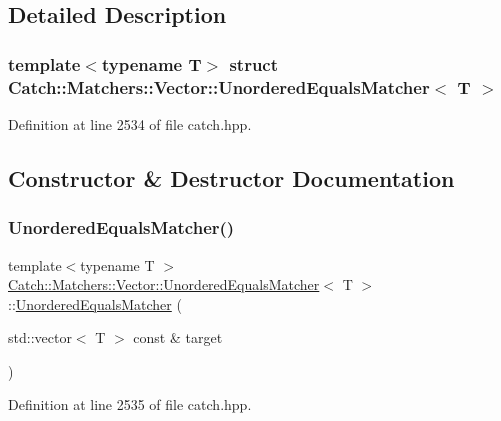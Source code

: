 \subsection{Detailed Description}
\subsubsection*{template$<$typename T$>$\newline
struct Catch\+::\+Matchers\+::\+Vector\+::\+Unordered\+Equals\+Matcher$<$ T $>$}



Definition at line 2534 of file catch.\+hpp.



\subsection{Constructor \& Destructor Documentation}
\mbox{\label{struct_catch_1_1_matchers_1_1_vector_1_1_unordered_equals_matcher_a525905639b2b15b52ddb0bf14bfa19da}} 
\subsubsection{\texorpdfstring{Unordered\+Equals\+Matcher()}{UnorderedEqualsMatcher()}}
{\footnotesize\ttfamily template$<$typename T $>$ \\
\mbox{\hyperlink{struct_catch_1_1_matchers_1_1_vector_1_1_unordered_equals_matcher}{Catch\+::\+Matchers\+::\+Vector\+::\+Unordered\+Equals\+Matcher}}$<$ T $>$\+::\mbox{\hyperlink{struct_catch_1_1_matchers_1_1_vector_1_1_unordered_equals_matcher}{Unordered\+Equals\+Matcher}} (\begin{DoxyParamCaption}\item[{std\+::vector$<$ T $>$ const \&}]{target }\end{DoxyParamCaption})\hspace{0.3cm}{\ttfamily [inline]}}



Definition at line 2535 of file catch.\+hpp.



